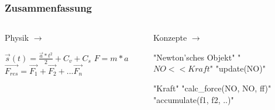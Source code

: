 \documentclass{beamer}
\begin{document}
\begin{frame}
\frametitle{Zusammenfassung}
\begin{columns}[T] %
\begin{column}{.33\textwidth}
Physik $\rightarrow$ \linebreak
\linebreak
\linebreak

\tiny$\overrightarrow{s}(t) = \frac{\overrightarrow{a}*t^2}{2} + C_v + C_s$
\linebreak
\linebreak
\linebreak
\linebreak
\tiny$F= m*a$
\linebreak
\linebreak
\linebreak
\linebreak
\tiny$\overrightarrow{F_{res}} = \overrightarrow{F_1} + \overrightarrow{F_2} +... \overrightarrow{F_n}$

\end{column}%
\hfill%
\begin{column}{.33\textwidth}

Konzepte $\rightarrow$ \linebreak
\linebreak

\tiny"Newton'sches Objekt" \linebreak
\linebreak
"$NO << Kraft$" \linebreak
\linebreak
"update(NO)"\linebreak
\linebreak
\linebreak

"Kraft" \linebreak
\linebreak
"calc\_force(NO, NO, ff)" \linebreak
\linebreak
"accumulate(f1, f2, ..)"
\end{column}%
\begin{column}{.33\textwidth}


\end{column}
\end{columns}
\end{frame}
\end{document}
